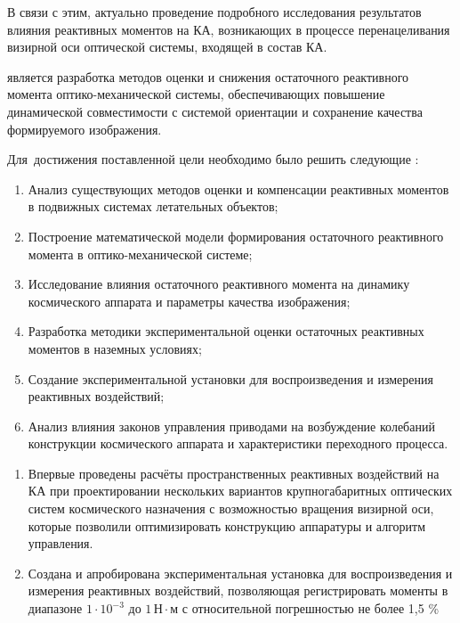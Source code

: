 В связи с этим, актуально проведение подробного исследования результатов влияния реактивных моментов на КА, возникающих в процессе перенацеливания визирной оси оптической системы, входящей в состав КА.



{\aim}  является разработка методов оценки и снижения остаточного реактивного момента оптико-механической системы, обеспечивающих повышение динамической совместимости с системой ориентации и сохранение качества формируемого изображения.

Для~достижения поставленной цели необходимо было решить следующие {\tasks}:
\begin{enumerate}[beginpenalty=10000] %
  \item Анализ существующих методов оценки и компенсации реактивных моментов в подвижных системах летательных объектов;
  \item Построение математической модели формирования остаточного реактивного момента в оптико-механической системе;
  \item Исследование влияния остаточного реактивного момента на динамику космического аппарата и параметры качества изображения;
  \item Разработка методики экспериментальной оценки остаточных реактивных моментов в наземных условиях;
  \item Создание экспериментальной установки для воспроизведения и измерения реактивных воздействий;
  \item Анализ влияния законов управления приводами на возбуждение колебаний конструкции космического аппарата и характеристики переходного процесса.
\end{enumerate}


{\novelty}
\begin{enumerate}[beginpenalty=10000] %
  \item Впервые проведены расчёты пространственных реактивных воздействий на КА при проектировании нескольких вариантов крупногабаритных оптических систем космического назначения с возможностью вращения визирной оси, которые позволили оптимизировать конструкцию аппаратуры и алгоритм управления.
  \item Создана и апробирована экспериментальная установка для воспроизведения и измерения реактивных воздействий, позволяющая регистрировать моменты в диапазоне $1 \cdot 10^{-3}$ до $1\,\text{Н}\cdot\text{м}$ с относительной погрешностью не более 1,5 \%
\end{enumerate}

